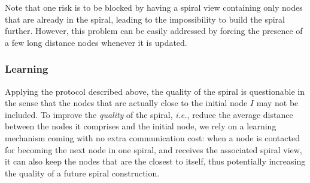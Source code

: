 Note that one risk is to be blocked by having a spiral view containing only
nodes that are already in the spiral, leading to the impossibility to build the
spiral further. However, this problem can be easily addressed by forcing the
presence of a few long distance nodes whenever it is updated.


\subsubsection*{Learning}

Applying the protocol described above, the quality of the spiral is
questionable in the sense that the nodes that are actually close to the initial
node $I$ may not be included.%
%
To improve the \emph{quality} of the spiral, \emph{i.e.}, reduce the average
distance between the nodes it comprises and the initial node, we rely on a
learning mechanism coming with no extra communication cost: when a node is
contacted for becoming the next node in one spiral, and receives the associated
spiral view, it can also keep the nodes that are the closest to itself, thus
potentially increasing the quality of a future spiral construction.



